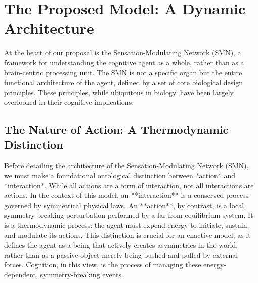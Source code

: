 \section{The Proposed Model: A Dynamic Architecture}
At the heart of our proposal is the Sensation-Modulating Network (SMN), a framework for understanding the cognitive agent as a whole, rather than as a brain-centric processing unit. The SMN is not a specific organ but the entire functional architecture of the agent, defined by a set of core biological design principles. These principles, while ubiquitous in biology, have been largely overlooked in their cognitive implications.

\subsection*{The Nature of Action: A Thermodynamic Distinction}
Before detailing the architecture of the Sensation-Modulating Network (SMN), we must make a foundational ontological distinction between *action* and *interaction*. While all actions are a form of interaction, not all interactions are actions. In the context of this model, an **interaction** is a conserved process governed by symmetrical physical laws. An **action**, by contrast, is a local, symmetry-breaking perturbation performed by a far-from-equilibrium system. It is a thermodynamic process: the agent must expend energy to initiate, sustain, and modulate its actions. This distinction is crucial for an enactive model, as it defines the agent as a being that actively creates asymmetries in the world, rather than as a passive object merely being pushed and pulled by external forces. Cognition, in this view, is the process of managing these energy-dependent, symmetry-breaking events.

